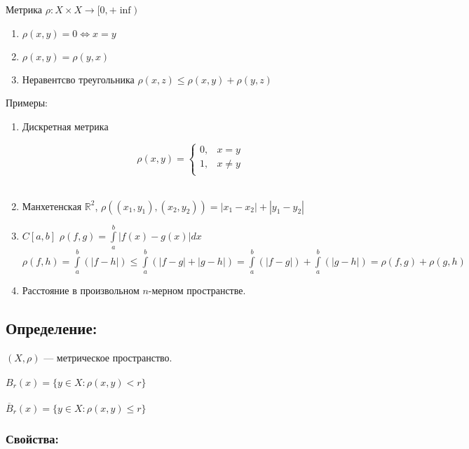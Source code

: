 \documentclass[12pt]{report} %
\begin{document}
Метрика $\rho : X \times X \rightarrow [0, +\inf)$
\begin{enumerate}
  \setlength{\parskip}{0pt} %
  \setlength{\itemsep}{0pt} %
  \item $\rho(x, y) = 0 \Leftrightarrow x = y$
  \item $\rho(x, y) = \rho(y, x)$
  \item Неравентсво треугольника $\rho(x, z) \leqslant \rho(x, y) + \rho(y, z)$
\end{enumerate}
Примеры:
\begin{enumerate}
  \setlength{\parskip}{0pt} %
  \setlength{\itemsep}{0pt} %
  \item Дискретная метрика  
  
  \begin{equation*}
 \rho(x, y) =  
 \begin{cases}
   0, & x = y\\
   1, & x \neq y\\
 \end{cases}
\end{equation*}\\
 \item Манхетенская $\mathbb{R}^2$, $\rho((x_1, y_1), (x_2, y_2)) = |x_1 - x_2| + |y_1 - y_2|$
 \item $C[a, b]$ $\rho(f, g) = \int\limits_{a}^{b}{|f(x) - g(x)|dx}$\\
 		$\rho(f, h) = \int\limits_{a}^{b}(|f - h|) \leqslant \int\limits_{a}^{b}(|f - g| + |g - h|) =
 		\int\limits_{a}^{b}(|f - g|)  + \int\limits_{a}^{b}(|g - h|) = \rho(f, g) + \rho(g, h) $
 		
 	\item Расстояние в произвольном $n$-мерном пространстве.
\end{enumerate} 

\subsection*{Определение:}
$(X, \rho)$ --- метрическое пространство. \\ \\
$B_r(x) = \{y \in X : \rho(x, y) < r\}$ \\ \\
$\overline{B}_r(x) = \{y \in X : \rho(x, y) \leqslant r\}$
\subsubsection*{Свойства:}
\end{document}
